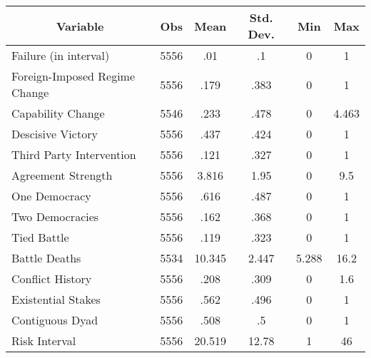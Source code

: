 \begin{tabular}{l c c c c c }\hline\hline
\multicolumn{1}{c}{Variable} & Obs & Mean & Std. Dev.
 & Min & Max  \\ \hline
Failure (in interval) & 5556 & .01 & .1 & 0 & 1  \\
Foreign-Imposed Regime Change & 5556 & .179 & .383 & 0 & 1  \\
Capability Change & 5546 & .233 & .478 & 0 & 4.463  \\
Descisive Victory & 5556 & .437 & .424 & 0 & 1  \\
Third Party Intervention & 5556 & .121 & .327 & 0 & 1  \\
Agreement Strength & 5556 & 3.816 & 1.95 & 0 & 9.5  \\
One Democracy & 5556 & .616 & .487 & 0 & 1  \\
Two Democracies & 5556 & .162 & .368 & 0 & 1  \\
Tied Battle & 5556 & .119 & .323 & 0 & 1  \\
Battle Deaths & 5534 & 10.345 & 2.447 & 5.288 & 16.2  \\
Conflict History & 5556 & .208 & .309 & 0 & 1.6  \\
Existential Stakes & 5556 & .562 & .496 & 0 & 1  \\
Contiguous Dyad & 5556 & .508 & .5 & 0 & 1  \\
Risk Interval & 5556 & 20.519 & 12.78 & 1 & 46  \\
\hline\end{tabular}

